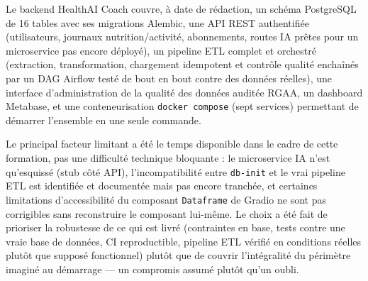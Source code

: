 \documentclass{article}
\begin{document}
Le backend HealthAI Coach couvre, à date de rédaction, un schéma PostgreSQL de 16 tables avec ses migrations Alembic, une API REST authentifiée (utilisateurs, journaux nutrition/activité, abonnements, routes IA prêtes pour un microservice pas encore déployé), un pipeline ETL complet et orchestré (extraction, transformation, chargement idempotent et contrôle qualité enchaînés par un DAG Airflow testé de bout en bout contre des données réelles), une interface d'administration de la qualité des données auditée RGAA, un dashboard Metabase, et une conteneurisation \texttt{docker compose} (sept services) permettant de démarrer l'ensemble en une seule commande.

Le principal facteur limitant a été le temps disponible dans le cadre de cette formation, pas une difficulté technique bloquante : le microservice IA n'est qu'esquissé (stub côté API), l'incompatibilité entre \texttt{db-init} et le vrai pipeline ETL est identifiée et documentée mais pas encore tranchée, et certaines limitations d'accessibilité du composant \texttt{Dataframe} de Gradio ne sont pas corrigibles sans reconstruire le composant lui-même. Le choix a été fait de prioriser la robustesse de ce qui est livré (contraintes en base, tests contre une vraie base de données, CI reproductible, pipeline ETL vérifié en conditions réelles plutôt que supposé fonctionnel) plutôt que de couvrir l'intégralité du périmètre imaginé au démarrage — un compromis assumé plutôt qu'un oubli.
\end{document}
